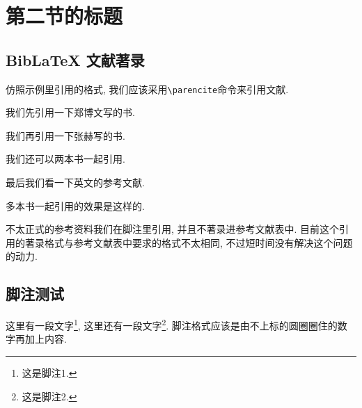 
\section{第二节的标题}

\zhlipsum[1]

\subsection{BibLaTeX 文献著录}

\nocite{*}

仿照示例里引用的格式, 我们应该采用\verb|\parencite|命令来引用文献.

我们先引用一下郑博文写的书\parencite{rudin1976principleschinese3}.

我们再引用一下张赫写的书\parencite{rudin1976principleschinese}.

我们还可以两本书一起引用\parencite{rudin1976principleschinese,rudin1976principleschinese3}.

最后我们看一下英文的参考文献\parencite{rudin1976principles}.

多本书一起引用的效果是这样的\parencite{rudin1976principleschinese,rudin1976principleschinese3, rudin1976principles, rudin1976principleschinese2}.

不太正式的参考资料我们在脚注里引用, 并且不著录进参考文献表中. 目前这个引用的著录格式与参考文献表中要求的格式不太相同, 不过短时间没有解决这个问题的动力.

\zhlipsum[1]

\subsection{脚注测试}

这里有一段文字\footnote{这是脚注1.}, 这里还有一段文字\footnote{这是脚注2.}. 脚注格式应该是由不上标的圆圈圈住的数字再加上内容.

\zhlipsum
